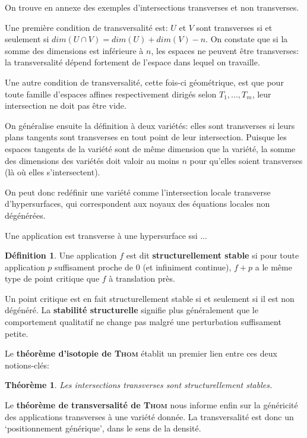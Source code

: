 \documentclass{article}
\theoremstyle{definition}
\newtheorem{defn}{Définition}
\theoremstyle{plain}
\newtheorem{thm}{Théorème}
\begin{document}
On trouve en annexe des exemples d'intersections transverses et non transverses.

Une première condition de transversalité est: $U$ et $V$ sont transverses si et seulement si $dim(U\cap V)=dim(U)+dim(V)-n$.
On constate que si la somme des dimensions est inférieure à $n$, les espaces ne peuvent être transverses: la transversalité dépend fortement de l'espace dans lequel on travaille.

Une autre condition de transversalité, cette fois-ci géométrique, est que pour toute famille d'espaces affines respectivement dirigés selon $T_1,...,T_m$, leur intersection ne doit pas être vide.

On généralise ensuite la définition à deux variétés: elles sont transverses si leurs plans tangents sont transverses en tout point de leur intersection.
Puisque les espaces tangents de la variété sont de même dimension que la variété, la somme des dimensions des variétés doit valoir au moins $n$ pour qu'elles soient transverses (là où elles s'intersectent).

On peut donc redéfinir une variété comme l'intersection locale transverse d'hypersurfaces, qui correspondent aux noyaux des équations locales non dégénérées.

Une application est transverse à une hypersurface ssi ...

\begin{defn}
Une application $f$ est dit \textbf{structurellement stable} si pour toute application $p$ suffisament proche de 0 (et infiniment continue), $f+p$ a le même type de point critique que $f$ à translation près.
\end{defn}

Un point critique est en fait structurellement stable si et seulement si il est non dégénéré.
La \textbf{stabilité structurelle} signifie plus généralement que le comportement qualitatif ne change pas malgré une perturbation suffisament petite.

Le \textbf{théorème d'isotopie de \textsc{Thom}} établit un premier lien entre ces deux notions-clés:

\begin{thm}
Les intersections transverses sont structurellement stables.
\end{thm}

Le \textbf{théorème de transversalité de \textsc{Thom}} nous informe enfin sur la généricité des applications transverses à une variété donnée.
La transversalité est donc un `positionnement générique', dans le sens de la densité.
\end{document}
